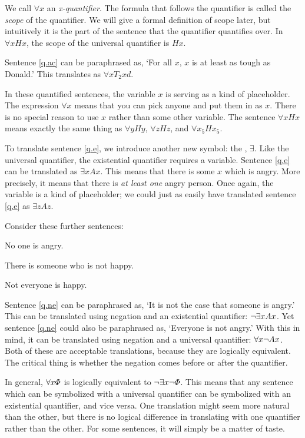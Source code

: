We call $\forall x$ an \emph{x-quantifier}. The formula that follows the quantifier is called the \emph{scope} of the quantifier. We will give a formal definition of scope later, but intuitively it is the part of the sentence that the quantifier quantifies over. In $\forall x Hx$, the scope of the universal quantifier is $Hx$.

Sentence \ref{q.ac} can be paraphrased as, `For all $x$, $x$ is at least as tough as Donald.' This translates as $\forall x T_2xd$.

In these quantified sentences, the variable $x$ is serving as a kind of placeholder. The expression $\forall x$ means that you can pick anyone and put them in as $x$. There is no special reason to use $x$ rather than some other variable. The sentence $\forall x Hx$ means exactly the same thing as $\forall y Hy$, $\forall z Hz$, and $\forall x_5 Hx_5$.

To translate sentence \ref{q.e}, we introduce another new symbol: the , $\exists$. Like the universal quantifier, the existential quantifier requires a variable. Sentence \ref{q.e} can be translated as $\exists x Ax$. This means that there is some $x$ which is angry. More precisely, it means that there is \emph{at least one} angry person. Once again, the variable is a kind of placeholder; we could just as easily have translated sentence \ref{q.e} as $\exists z Az$.

Consider these further sentences:
\begin{earg}
\item[\ex{q.ne}] No one is angry.
\item[\ex{q.en}] There is someone who is not happy.
\item[\ex{q.na}] Not everyone is happy.
\end{earg}

Sentence \ref{q.ne} can be paraphrased as, `It is not the case that someone is angry.' This can be translated using negation and an existential quantifier: $\neg \exists x Ax$. Yet sentence \ref{q.ne} could also be paraphrased as, `Everyone is not angry.' With this in mind, it can be translated using negation and a universal quantifier: $\forall x \neg Ax$. Both of these are acceptable translations, because they are logically equivalent. The critical thing is whether the negation comes before or after the quantifier.

In general, $\forall x\varPhi{}$ is logically equivalent to $\neg\exists x\neg\varPhi{}$. This means that any sentence which can be symbolized with a universal quantifier can be symbolized with an existential quantifier, and vice versa. One translation might seem more natural than the other, but there is no logical difference in translating with one quantifier rather than the other. For some sentences, it will simply be a matter of taste.

